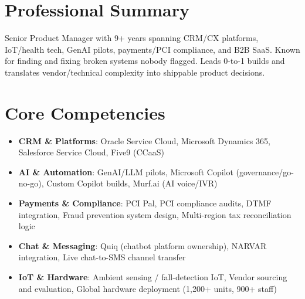 \documentclass[11pt,a4paper,sans]{moderncv}
\newcommand{\flushitemize}{\setlength{\leftmargini}{0pt}\setlength{\labelsep}{0pt}\setlength{\labelwidth}{0pt}\setlength{\itemindent}{0pt}\setlength{\listparindent}{0pt}}
\begin{document}
\makecvtitle


\section{Professional Summary}
\vspace{1pt}
\small{Senior Product Manager with 9+ years spanning CRM/CX platforms, IoT/health tech, GenAI pilots, payments/PCI compliance, and B2B SaaS. Known for finding and fixing broken systems nobody flagged. Leads 0-to-1 builds and translates vendor/technical complexity into shippable product decisions.}


\section{Core Competencies}
\vspace{1pt}
{\flushitemize
\begin{itemize}

\item \textbf{CRM \& Platforms}: Oracle Service Cloud, Microsoft Dynamics 365, Salesforce Service Cloud, Five9 (CCaaS)

\item \textbf{AI \& Automation}: GenAI/LLM pilots, Microsoft Copilot (governance/go-no-go), Custom Copilot builds, Murf.ai (AI voice/IVR)

\item \textbf{Payments \& Compliance}: PCI Pal, PCI compliance audits, DTMF integration, Fraud prevention system design, Multi-region tax reconciliation logic

\item \textbf{Chat \& Messaging}: Quiq (chatbot platform ownership), NARVAR integration, Live chat-to-SMS channel transfer

\item \textbf{IoT \& Hardware}: Ambient sensing / fall-detection IoT, Vendor sourcing and evaluation, Global hardware deployment (1,200+ units, 900+ staff)

\end{itemize}}

\end{document}

